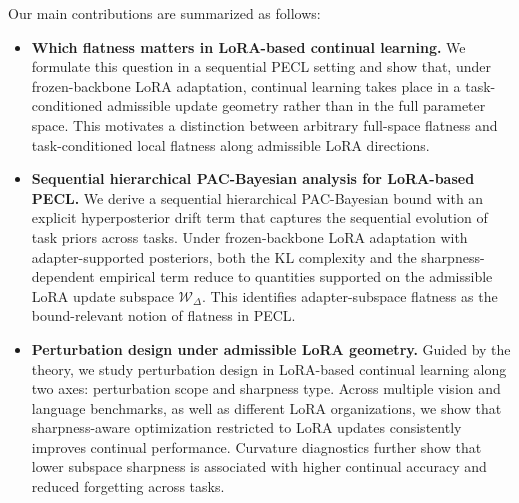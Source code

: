 \documentclass[10pt]{article} %
\begin{document}



Our main contributions are summarized as follows:
\begin{itemize}
    \item \textbf{Which flatness matters in LoRA-based continual learning.}
    We formulate this question in a sequential PECL setting and show that, under frozen-backbone LoRA adaptation, continual learning takes place in a task-conditioned admissible update geometry rather than in the full parameter space. This motivates a distinction between arbitrary full-space flatness and task-conditioned local flatness along admissible LoRA directions.
    \item \textbf{Sequential hierarchical PAC-Bayesian analysis for LoRA-based PECL.}
    We derive a sequential hierarchical PAC-Bayesian bound with an explicit hyperposterior drift term that captures the sequential evolution of task priors across tasks. Under frozen-backbone LoRA adaptation with adapter-supported posteriors, both the KL complexity and the sharpness-dependent empirical term reduce to quantities supported on the admissible LoRA update subspace $\mathcal{W}_\Delta$. This identifies adapter-subspace flatness as the bound-relevant notion of flatness in PECL.
    \item \textbf{Perturbation design under admissible LoRA geometry.}
    Guided by the theory, we study perturbation design in LoRA-based continual learning along two axes: perturbation scope and sharpness type. Across multiple vision and language benchmarks, as well as different LoRA organizations, we show that sharpness-aware optimization restricted to LoRA updates consistently improves continual performance. Curvature diagnostics further show that lower subspace sharpness is associated with higher continual accuracy and reduced forgetting across tasks.
\end{itemize}
\end{document}
